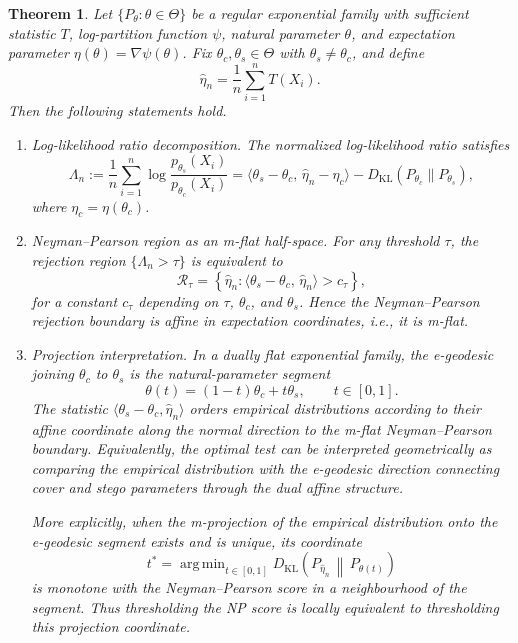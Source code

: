 \documentclass[a4paper,fleqn]{cas-dc}
\newtheorem{theorem}{Theorem}
\DeclareMathOperator*{\argmin}{arg\,min}
\newcommand{\DKL}{D_{\mathrm{KL}}}
\begin{document}
\begin{theorem}
\label{thm:detection_duality}
Let $\{P_\theta : \theta\in\Theta\}$ be a regular exponential family with
sufficient statistic $T$, log-partition function $\psi$, natural parameter
$\theta$, and expectation parameter
$\eta(\theta)=\nabla\psi(\theta)$.
Fix $\theta_c,\theta_s\in\Theta$ with $\theta_s\neq\theta_c$, and define
\[
\hat\eta_n
=
\frac{1}{n}\sum_{i=1}^n T(X_i).
\]
Then the following statements hold.

\begin{enumerate}
  \item[(i)] \emph{Log-likelihood ratio decomposition.}
  The normalized log-likelihood ratio satisfies
  \begin{equation}
    \Lambda_n
    :=
    \frac{1}{n}
    \sum_{i=1}^n
    \log\frac{p_{\theta_s}(X_i)}{p_{\theta_c}(X_i)}
    =
    \bigl\langle
      \theta_s-\theta_c,\,
      \hat\eta_n-\eta_c
    \bigr\rangle
    -
    \DKL(P_{\theta_c}\|P_{\theta_s}),
    \label{eq:llr_decomp}
  \end{equation}
  where $\eta_c=\eta(\theta_c)$.

  \item[(ii)] \emph{Neyman--Pearson region as an m-flat half-space.}
  For any threshold $\tau$, the rejection region
  $\{\Lambda_n>\tau\}$ is equivalent to
  \begin{equation}
    \mathcal{R}_{\tau}
    =
    \left\{
      \hat\eta_n :
      \bigl\langle
        \theta_s-\theta_c,\,
        \hat\eta_n
      \bigr\rangle
      >
      c_{\tau}
    \right\},
    \label{eq:np_halfspace}
  \end{equation}
  for a constant $c_{\tau}$ depending on $\tau$, $\theta_c$, and
  $\theta_s$.  Hence the Neyman--Pearson rejection boundary is affine in
  expectation coordinates, i.e., it is m-flat.

  \item[(iii)] \emph{Projection interpretation.}
  In a dually flat exponential family, the e-geodesic joining
  $\theta_c$ to $\theta_s$ is the natural-parameter segment
  \[
    \theta(t)=(1-t)\theta_c+t\theta_s,
    \qquad t\in[0,1].
  \]
  The statistic
  $\langle\theta_s-\theta_c,\hat\eta_n\rangle$ orders empirical
  distributions according to their affine coordinate along the normal
  direction to the m-flat Neyman--Pearson boundary.  Equivalently, the
  optimal test can be interpreted geometrically as comparing the empirical
  distribution with the e-geodesic direction connecting cover and stego
  parameters through the dual affine structure.

  More explicitly, when the m-projection of the empirical distribution onto
  the e-geodesic segment exists and is unique, its coordinate
  \[
    t^*
    =
    \argmin_{t\in[0,1]}
    \DKL\!\left(
      P_{\hat\eta_n}
      \,\middle\|\,
      P_{\theta(t)}
    \right)
    \label{eq:m_projection_coordinate}
  \]
  is monotone with the Neyman--Pearson score in a neighbourhood of the
  segment.  Thus thresholding the NP score is locally equivalent to
  thresholding this projection coordinate.
\end{enumerate}
\end{theorem}
\end{document}
